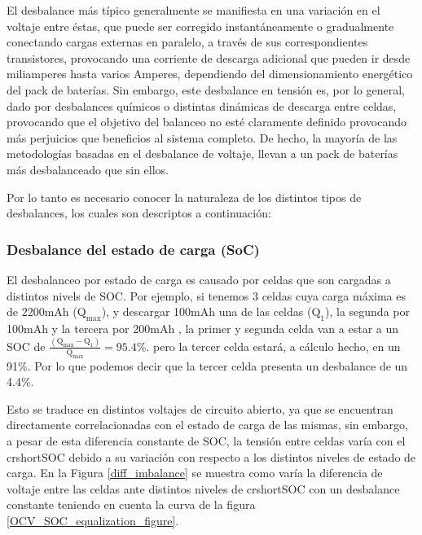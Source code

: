 \documentclass[10pt,a4paper]{article}
\begin{document}
\noindent El desbalance más típico generalmente se manifiesta en una variación
en el voltaje entre éstas, que puede ser corregido instantáneamente o
gradualmente conectando cargas externas en paralelo, a través de sus
correspondientes transistores, provocando una corriente de descarga adicional
que pueden ir desde miliamperes hasta varios Amperes, dependiendo del
dimensionamiento energético del pack de baterías. Sin embargo, este desbalance
en tensión es, por lo general, dado por desbalances químicos o distintas
dinámicas de descarga entre celdas, provocando que el objetivo del balanceo no
esté claramente definido provocando más perjuicios que beneficios al sistema
completo.  De hecho, la mayoría de las metodologías basadas en el desbalance de
voltaje, llevan a un pack de baterías más desbalanceado que sin ellos.

\noindent Por lo tanto es necesario conocer la naturaleza de los distintos tipos
de desbalances, los cuales son descriptos a continuación:

\subsubsection{Desbalance del estado de carga (SoC)}

\noindent El desbalanceo por estado de carga es causado por celdas que son
cargadas a distintos nivels de \acrshort{SOC}. Por ejemplo, si tenemos 3 celdas
cuya carga máxima es de 2200mAh ($\mathrm{Q_{max}}$), y descargar 100mAh una de
las celdas ($\mathrm{Q_1}$), la segunda por 100mAh y la tercera por 200mAh , la
primer y segunda celda van a estar a un \acrshort{SOC} de
$\mathrm{\frac{(Q_{max} - Q_1)}{Q_{max}} = 95.4\%}$. pero la tercer celda
estará, a cálculo hecho, en un 91\%. Por lo que podemos decir que la tercer
celda presenta un desbalance de un 4.4\%. 

Esto se traduce en distintos voltajes de circuito abierto, ya que se encuentran
directamente correlacionadas con el estado de carga de las mismas, sin embargo,
a pesar de esta diferencia constante de \acrshort{SOC}, la tensión entre celdas
varía con el crshort{SOC} debido a su variación con respecto a los distintos
niveles de estado de carga. En la Figura \ref{diff_imbalance} se muestra como
varía la diferencia de voltaje entre las celdas ante distintos niveles de
crshort{SOC} con un desbalance constante teniendo en cuenta la curva de la
figura \ref{OCV_SOC_equalization_figure}.
\end{document}
